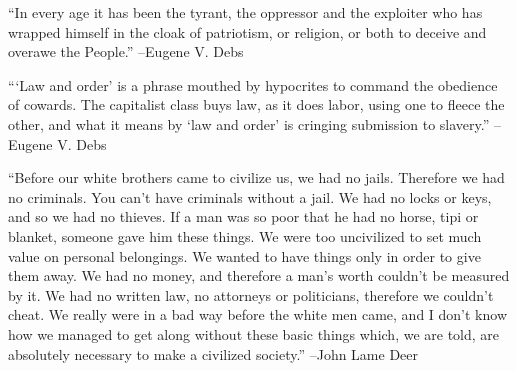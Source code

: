 \documentclass{article}%
\begin{document}
\begin{minipage}{\textwidth}%
\flushleft%
“In every age it has been the tyrant, the oppressor and the exploiter who has wrapped himself in the cloak of patriotism, or religion, or both to deceive and overawe the People.”%
\linebreak%
\vspace{1mm}%
–Eugene V. Debs%
\linebreak%
\vspace{1mm}%
\end{minipage}%
\linebreak%
\vspace{1mm}%
\begin{minipage}{\textwidth}%
\flushleft%
“‘Law and order’ is a phrase mouthed by hypocrites to command the obedience of cowards. The capitalist class buys law, as it does labor, using one to fleece the other, and what it means by ‘law and order’ is cringing submission to slavery.”%
\linebreak%
\vspace{1mm}%
–Eugene V. Debs%
\linebreak%
\vspace{1mm}%
\end{minipage}%
\linebreak%
\vspace{1mm}%
\begin{minipage}{\textwidth}%
\flushleft%
“Before our white brothers came to civilize us, we had no jails. Therefore we had no criminals. You can't have criminals without a jail. We had no locks or keys, and so we had no thieves. If a man was so poor that he had no horse, tipi or blanket, someone gave him these things. We were too uncivilized to set much value on personal belongings. We wanted to have things only in order to give them away. We had no money, and therefore a man's worth couldn't be measured by it. We had no written law, no attorneys or politicians, therefore we couldn't cheat. We really were in a bad way before the white men came, and I don't know how we managed to get along without these basic things which, we are told, are absolutely necessary to make a civilized society.”%
\linebreak%
\vspace{1mm}%
–John Lame Deer%
\linebreak%
\vspace{1mm}%
\end{minipage}%
\linebreak%
\vspace{1mm}%
\end{document}
